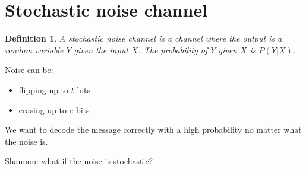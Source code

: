\documentclass[letterpaper,12pt]{article}
\newtheorem{definition}{Definition}
\begin{document}
\section{Stochastic noise channel}
\begin{definition}
    A stochastic noise channel is a channel where the output is a random variable $Y$ given the input $X$. The probability of $Y$ given $X$ is $P(Y|X)$.
\end{definition}
Noise can be:\begin{itemize}
    \item flipping up to $t$ bits
    \item erasing up to $e$ bits
\end{itemize}
We want to decode the message correctly with a high probability no matter what the noise is.

Shannon: what if the noise is stochastic?
\end{document}
